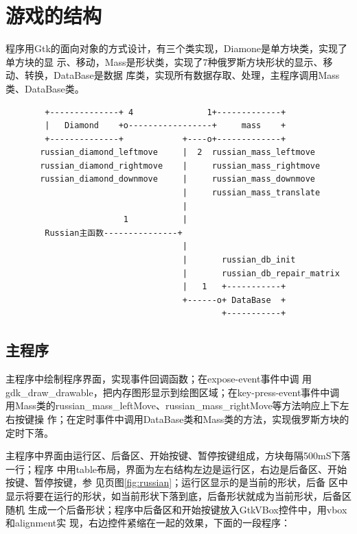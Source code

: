 

\section{游戏的结构}


程序用Gtk的面向对象的方式设计，有三个类实现，Diamone是单方块类，实现了单方块的显
示、移动，Mass是形状类，实现了7种俄罗斯方块形状的显示、移动、转换，DataBase是数据
库类，实现所有数据存取、处理，主程序调用Mass类、DataBase类。


\begin{shell}
\begin{verbatim}                         
        +--------------+ 4               1+-------------+           
        |   Diamond    +o-----------------+     mass    +           
        +--------------+            +----o+-------------+           
       russian_diamond_leftmove     |  2  russian_mass_leftmove     
       russian_diamond_rightmove    |     russian_mass_rightmove    
       russian_diamond_downmove     |     russian_mass_downmove     
                                    |     russian_mass_translate    
                                    |                               
                        1           |                               
        Russian主函数---------------+                               
                                    |                               
                                    |       russian_db_init         
                                    |       russian_db_repair_matrix
                                    |   1   +-----------+
                                    +------o+ DataBase  +
                                            +-----------+
\end{verbatim}
\end{shell}


\subsection{主程序}


主程序中绘制程序界面，实现事件回调函数；在expose-event事件中调
用gdk\_draw\_drawable，把内存图形显示到绘图区域；在key-press-event事件中调
用Mass类的russian\_mass\_leftMove、russian\_mass\_rightMove等方法响应上下左右按键操
作；在定时事件中调用DataBase类和Mass类的方法，实现俄罗斯方块的定时下落。

主程序中界面由运行区、后备区、开始按键、暂停按键组成，方块毎隔500mS下落一行；程序
中用table布局，界面为左右结构左边是运行区，右边是后备区、开始按键、暂停按键，参
见\pageref{fig:russian}页图\ref{fig:russian}；运行区显示的是当前的形状，后备
区中显示将要在运行的形状，如当前形状下落到底，后备形状就成为当前形状，后备区随机
生成一个后备形状；程序中后备区和开始按键放入GtkVBox控件中，用vbox和alignment实
现，右边控件紧缩在一起的效果，下面的一段程序：

